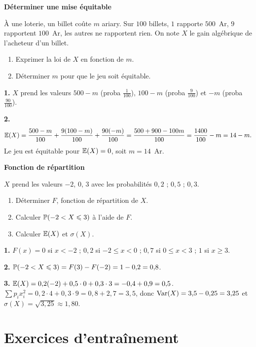 \exerciceresolu
\textbf{Déterminer une mise équitable}

À une loterie, un billet coûte $m$ ariary. Sur $100$ billets, $1$ rapporte
$500$~Ar, $9$ rapportent $100$~Ar, les autres ne rapportent rien. On note $X$
le gain algébrique de l'acheteur d'un billet.
\begin{enumerate}
	\item Exprimer la loi de $X$ en fonction de $m$.
	\item Déterminer $m$ pour que le jeu soit équitable.
\end{enumerate}

\solution

\textbf{1.} $X$ prend les valeurs $500-m$ (proba $\frac{1}{100}$),
$100-m$ (proba $\frac{9}{100}$) et $-m$ (proba $\frac{90}{100}$).

\textbf{2.}
\[
\mathbb{E}(X) = \frac{500-m}{100} + \frac{9(100-m)}{100} + \frac{90(-m)}{100}
= \frac{500 + 900 - 100m}{100} = \frac{1400}{100} - m = 14 - m.
\]
Le jeu est équitable pour $\mathbb{E}(X)=0$, soit $m = 14$~Ar.

\exerciceresolu
\textbf{Fonction de répartition}

$X$ prend les valeurs $-2$, $0$, $3$ avec les probabilités $0{,}2$ ; $0{,}5$ ;
$0{,}3$.
\begin{enumerate}
	\item Déterminer $F$, fonction de répartition de $X$.
	\item Calculer $\mathbb{P}(-2 < X \leqslant 3)$ à l'aide de $F$.
	\item Calculer $\mathbb{E}(X)$ et $\sigma(X)$.
\end{enumerate}

\solution

\textbf{1.} $F(x)=0$ si $x<-2$ ; $0{,}2$ si $-2\leqslant x<0$ ; $0{,}7$ si
$0\leqslant x<3$ ; $1$ si $x\geqslant3$.

\textbf{2.} $\mathbb{P}(-2<X\leqslant3) = F(3)-F(-2) = 1 - 0{,}2 = 0{,}8$.

\textbf{3.} $\mathbb{E}(X) = 0{,}2(-2)+0{,}5\cdot0+0{,}3\cdot3 = -0{,}4+0{,}9
= 0{,}5$.
$\sum p_i x_i^2 = 0{,}2\cdot4 + 0{,}3\cdot9 = 0{,}8+2{,}7 = 3{,}5$, donc
$\mathrm{Var}(X)=3{,}5-0{,}25 = 3{,}25$ et $\sigma(X)=\sqrt{3{,}25}\approx1{,}80$.


\section{Exercices d'entraînement}


